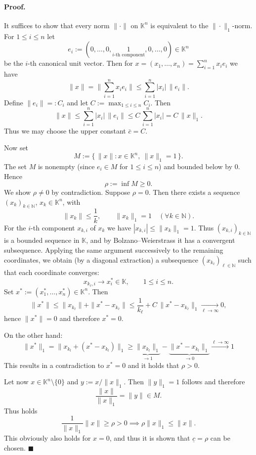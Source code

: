 \documentclass[12pt]{article}
\newcommand{\N}{\mathbb{N}}
\newcommand{\K}{\mathbb{K}} %
\begin{document}
	\paragraph{Proof.}
	It suffices to show that every norm $\|\cdot\|$ on $\K^{n}$ is equivalent to the $\|\cdot\|_{1}$-norm. For $1\le i\le n$ let
	\[
		e_i := (0,\dots,0,\underset{\text{$i$-th component}}{1},0,\dots,0)\in\K^{n}
	\]
	be the $i$-th canonical unit vector. Then for $x=(x_1,\dots,x_n)=\sum_{i=1}^{n} x_i e_i$ we have
	\[
		\|x\| = \bigg\|\sum_{i=1}^{n} x_i e_i\bigg\| \le \sum_{i=1}^{n} |x_i|\,\|e_i\|.
	\]
	Define $\|e_i\| =: C_i$ and let $C := \max_{1\le i\le n} C_i$. Then
	\[
		\|x\| \le \sum_{i=1}^{n} |x_i|\,\|e_i\| \le C\, \sum_{i=1}^{n} |x_i| = C\,\|x\|_{1}.
	\]
	Thus we may choose the upper constant $\bar c=C$.

	Now set
	\[
		M := \{\, \|x\| : x\in\K^{n},\ \|x\|_{1}=1\,\}.
	\]
	The set $M$ is nonempty (since $e_i\in M$ for $1\le i\le n$) and bounded below by $0$. Hence
	\[
		\rho := \inf M \ge 0.
	\]
	We show $\rho\ne0$ by contradiction. Suppose $\rho=0$. Then there exists a sequence $(x_k)_{k\in\N}$, $x_k\in\K^{n}$, with
	\[
		\|x_k\| \le \frac{1}{k}, \qquad \|x_k\|_{1} = 1 \quad (\forall k\in\N).
	\]
	For the $i$-th component $x_{k,i}$ of $x_k$ we have $|x_{k,i}| \le \|x_k\|_{1} = 1$. Thus $(x_{k,i})_{k\in\N}$ is a bounded sequence in $\K$, and by Bolzano--Weierstrass it has a convergent subsequence. Applying the same argument successively to the remaining coordinates, we obtain (by a diagonal extraction) a subsequence $(x_{k_\ell})_{\ell\in\N}$ such that each coordinate converges:
	\[
		x_{k_\ell,i} \to x_i^{*} \in \K, \qquad 1\le i\le n.
	\]
	Set $x^{*} := (x_1^{*},\dots,x_n^{*})\in\K^{n}$. Then
	\[
		\|x^{*}\| \le \|x_{k_\ell}\| + \|x^{*}-x_{k_\ell}\| \le \frac{1}{k_\ell} + C\,\|x^{*}-x_{k_\ell}\|_{1} \xrightarrow[\ell\to\infty]{} 0,
	\]
	hence $\|x^{*}\|=0$ and therefore $x^{*}=0$. 
	
	\noindent On the other hand:
\[
\|x^*\|_1 = \|x_{k_l} + (x^* - x_{k_l})\|_1 \ge \underbrace{\|x_{k_l}\|_1}_{\to 1} - \underbrace{\|x^* - x_{k_l}\|_1}_{\to 0} \xrightarrow{\ell \to \infty} 1
\]
This results in a contradiction to $x^* = 0$ and it holds that $\rho > 0$.

Let now $x \in \K^n \setminus \{0\}$ and $y := x/\|x\|_1$. Then $\|y\|_1 = 1$ follows and therefore
\[
\frac{\|x\|}{\|x\|_1} = \|y\| \in M.
\]
Thus holds
\[
\frac{1}{\|x\|_1} \|x\| \ge \rho > 0 \implies \rho \|x\|_1 \le \|x\|.
\]
This obviously also holds for $x = 0$, and thus it is shown that $\underline{c} = \rho$ can be chosen. \hfill $\blacksquare$
\end{document}
